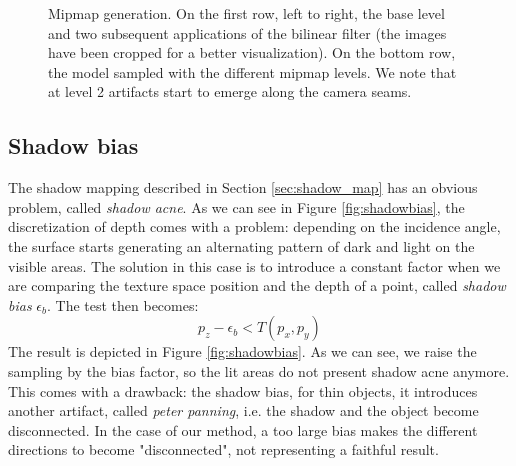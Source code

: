 \begin{figure}[!h]
{  \label{fig:jemip1}
} 
\caption{Mipmap generation. On the first row, left to right, the base level and two subsequent applications of the bilinear filter (the images have been cropped for a better visualization). On the bottom row, the model sampled with the different mipmap levels. We note that at level 2 artifacts start to emerge along the camera seams.}
\label{fig:mipmaps}
\end{figure}

\FloatBarrier
\subsection{Shadow bias}

The shadow mapping described in Section \ref{sec:shadow_map} has an obvious problem, called \emph{shadow acne}. As we can see in Figure \ref{fig:shadowbias}, the discretization of depth comes with a problem: depending on the incidence angle, the surface starts generating an alternating pattern of dark and light on the visible areas. The solution in this case is to introduce a constant factor when we are comparing the texture space position and the depth of a point, called \emph{shadow bias} $\epsilon_b$. The test then becomes:
$$
p_z - \epsilon_b < T(p_x,p_y)
$$ 
The result is depicted in Figure \ref{fig:shadowbias}. As we can see, we raise the sampling by the bias factor, so the lit areas do not present shadow acne anymore. This comes with a drawback: the shadow bias, for thin objects, it introduces another artifact, called \emph{peter panning}, i.e. the shadow and the object become disconnected. In the case of our method, a too large bias makes the different directions to become "disconnected", not representing a faithful result. 

